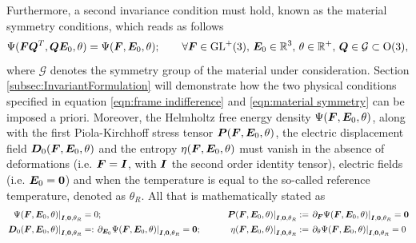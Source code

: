 Furthermore, a second invariance condition must hold, known as the material symmetry conditions, which reads as follows
%
\begin{equation}\label{eqn:material symmetry}
	\Psi(\boldsymbol{F}\boldsymbol{Q}^T,\boldsymbol{Q}\boldsymbol{E}_0,\theta) = \Psi(\boldsymbol{F},\boldsymbol{E}_0,\theta);\qquad \forall \boldsymbol{F}\in \text{GL}^{+}(3),\, \boldsymbol{E}_0 \in \mathbb{R}^3,\,\theta \in \mathbb{R}^{+}, \,\boldsymbol{Q}\in \mathcal{G}\subset \text{O}(3),
\end{equation}
%
where $\mathcal{G}$ denotes the symmetry group of the material under consideration.  Section \ref{subsec:InvariantFormulation} will demonstrate how the two physical conditions specified in equation \eqref{eqn:frame indifference} and \eqref{eqn:material symmetry} can be imposed a priori. 
 Moreover, the Helmholtz free energy density $\Psi(\boldsymbol{F},\boldsymbol{E}_0,\theta)$, along with the first Piola-Kirchhoff stress tensor $\boldsymbol{P}(\boldsymbol{F},\boldsymbol{E}_0,\theta)$, the electric displacement field $\boldsymbol{D}_0(\boldsymbol{F},\boldsymbol{E}_0,\theta)$ and the entropy $\eta(\boldsymbol{F},\boldsymbol{E}_0,\theta)$ must vanish in the absence of deformations (i.e. $\boldsymbol{F}=\boldsymbol{I}$, with $\boldsymbol{I}$ the second order identity tensor), electric fields (i.e. $\boldsymbol{E}_0=\boldsymbol{0}$) and when the temperature is equal to the so-called reference temperature, denoted as $\theta_R$. All that is mathematically stated as
%
\begin{equation}\label{eqn:reference conditions}
\begin{aligned}	
\left.\Psi(\vect{F},\vect{E}_0,\theta)\right\vert_{\vect{I},\vect{0},\theta_R}&=0; &\qquad \left.\vect{P}(\vect{F},\vect{E}_0,\theta)\right\vert_{\vect{I},\vect{0},\theta_R}&:=\left.\partial_{\vect{F}}\Psi(\vect{F},\vect{E}_0,\theta)\right\vert_{\vect{I},\vect{0},\theta_R}=\vect{0}\\
%
\left.\vect{D}_0(\vect{F},\vect{E}_0,\theta)\right\vert_{\vect{I},\vect{0},\theta_R}&=:\left.\partial_{\vect{E}_0}\Psi(\vect{F},\vect{E}_0,\theta)\right\vert_{\vect{I},\vect{0},\theta_R}=\vect{0}; &\qquad \left.\eta(\vect{F},\vect{E}_0,\theta)\right\vert_{\vect{I},\vect{0},\theta_R}&:=\left.\partial_{\theta}\Psi(\vect{F},\vect{E}_0,\theta)\right\vert_{\vect{I},\vect{0},\theta_R}={0}
\end{aligned}	
\end{equation}

